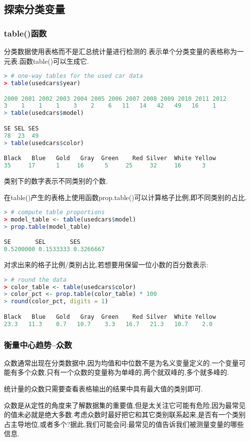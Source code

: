 \documentclass[11pt,a4paper,oneside]{book}
\begin{document}
\subsection{探索分类变量}
\subsubsection{table()函数}
分类数据使用表格而不是汇总统计量进行检测的.表示单个分类变量的表格称为一元表.函数table()可以生成它.
\begin{lstlisting}[language=r]
> # one-way tables for the used car data
> table(usedcars$year)

2000 2001 2002 2003 2004 2005 2006 2007 2008 2009 2010 2011 2012 
3    1    1    1    3    2    6   11   14   42   49   16    1 
> table(usedcars$model)

SE SEL SES 
78  23  49 
> table(usedcars$color)

Black   Blue   Gold   Gray  Green    Red Silver  White Yellow 
35     17      1     16      5     25     32     16      3 
\end{lstlisting}
类别下的数字表示不同类别的个数.

在table()产生的表格上使用函数prop.table()可以计算格子比例,即不同类别的占比.
\begin{lstlisting}[language=r]
> # compute table proportions
> model_table <- table(usedcars$model)
> prop.table(model_table)

SE       SEL       SES 
0.5200000 0.1533333 0.3266667 
\end{lstlisting}
对求出来的格子比例/类别占比,若想要用保留一位小数的百分数表示:
\begin{lstlisting}[language=r]
> # round the data
> color_table <- table(usedcars$color)
> color_pct <- prop.table(color_table) * 100
> round(color_pct, digits = 1)

Black   Blue   Gold   Gray  Green    Red Silver  White Yellow 
23.3   11.3    0.7   10.7    3.3   16.7   21.3   10.7    2.0 
\end{lstlisting}
\subsubsection{衡量中心趋势--众数}
众数通常出现在分类数据中,因为均值和中位数不是为名义变量定义的.一个变量可能有多个众数,只有一个众数的变量称为单峰的,两个就双峰的,多个就多峰的.
\begin{tcolorbox}[colback=pink!10!white,colframe=pink!100!black]
统计量的众数只需要查看表格输出的结果中具有最大值的类别即可.
\end{tcolorbox}
众数是从定性的角度来了解数据集的重要值,但是太关注它可能有危险,因为最常见的值未必就是绝大多数.考虑众数时最好把它和其它类别联系起来,是否有一个类别占主导地位,或者多个?据此,我们可能会问:最常见的值告诉我们被测量变量的哪些信息.
\end{document}
